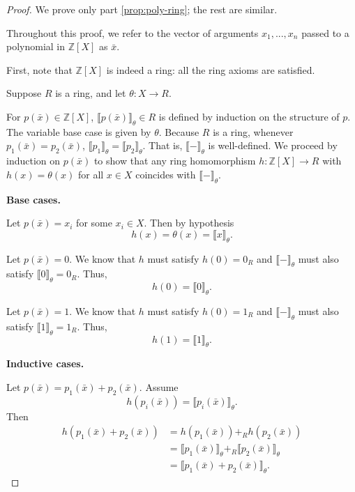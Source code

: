 \documentclass{msthesis}
\theoremstyle{definition}
\newcommand{\semof}[1]{\llbracket{#1}\rrbracket}
\newcommand{\ints}{\mathbb{Z}}
\begin{document}
\begin{proof}
We prove only part \ref{prop:poly-ring}; the rest are similar.

Throughout this proof, we refer to the vector of arguments $x_1, ..., x_n$ passed to a polynomial in $\ints[X]$ as $\bar{x}$.

First, note that $\ints[X]$ is indeed a ring: all the ring axioms are satisfied.

Suppose $R$ is a ring, and let $\theta : X \to R$.

For $p(\bar{x}) \in \ints[X]$,  $\semof{p(\bar{x})}_\theta \in R$ is defined by induction on the structure of $p$. The variable base case is given by $\theta$.  Because $R$ is a ring, whenever $p_1(\bar{x}) = p_2(\bar{x})$, $\semof{p_1}_\theta = \semof{p_2}_\theta$. That is, $\semof{-}_\theta$ is well-defined.  We proceed by induction on $p(\bar{x})$ to show that any ring homomorphism $h : \ints[X] \to R$ with $h(x) = \theta(x)$ for all $x \in X$ coincides with $\semof{-}_\theta$.  

\medskip
{}
\noindent
\textbf{Base cases.}

\medskip

\noindent
Let $p(\bar{x}) = x_i$ for some $x_i \in X$. Then by hypothesis
\[
  h(x) = \theta(x) = \semof{x}_\theta.
\]

\medskip

\noindent
Let $p(\bar{x}) = 0$. We know that $h$ must satisfy $h(0) = 0_R$ and 
$\semof{-}_\theta$ must also satisfy $\semof{0}_\theta = 0_R$. Thus,
\[
  h(0) = \semof{0}_\theta.
\]

\medskip

\noindent
Let $p(\bar{x}) = 1$. We know that $h$ must satisfy $h(0) = 1_R$ and 
$\semof{-}_\theta$ must also satisfy $\semof{1}_\theta = 1_R$. Thus,
\[
  h(1) = \semof{1}_\theta.
\]

\medskip

\noindent
\textbf{Inductive cases.}

\medskip

\noindent
Let $p(\bar{x}) = p_1(\bar{x}) + p_2(\bar{x})$. Assume
\[
  h(p_i(\bar{x})) = \semof{p_i(\bar{x})}_\theta.
\]
Then
\begin{align*}
  h(p_1(\bar{x}) + p_2(\bar{x}))
  &= h(p_1(\bar{x})) +_R h(p_2(\bar{x})) \\
  &= \semof{p_1(\bar{x})}_\theta +_R \semof{p_2(\bar{x})}_\theta \\
  &= \semof{p_1(\bar{x}) + p_2(\bar{x})}_\theta.
\end{align*}


\end{proof}
\end{document}
